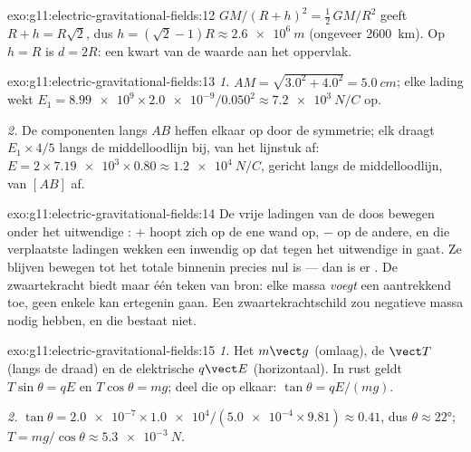 \begin{solution}{exo:g11:electric-gravitational-fields:12}
$GM/(R+h)^2 = \tfrac12\,GM/R^2$ geeft $R + h = R\sqrt{2}$, dus
$h = (\sqrt{2} - 1)R \approx \qty{2.6e6}{m}$ (ongeveer \qty{2600}{km}).
Op $h = R$ is $d = 2R$: een kwart van de waarde aan het oppervlak.
\end{solution}

\begin{solution}{exo:g11:electric-gravitational-fields:13}
\emph{1.} $AM = \sqrt{3.0^2 + 4.0^2} = \qty{5.0}{cm}$; elke lading wekt
$E_1 = \num{8.99e9} \times \num{2.0e-9} / 0.050^2 \approx
\qty{7.2e3}{N/C}$ op.

\emph{2.} De componenten langs $AB$ heffen elkaar op door de symmetrie;
elk  draagt $E_1 \times 4/5$ langs de middelloodlijn bij, van het
lijnstuk af: $E = 2 \times \num{7.19e3} \times 0.80 \approx
\qty{1.2e4}{N/C}$, gericht langs de middelloodlijn, van $[AB]$ af.
\end{solution}

\begin{solution}{exo:g11:electric-gravitational-fields:14}
De vrije ladingen van de doos bewegen onder het uitwendige : $+$
hoopt zich op de ene wand op, $-$ op de andere, en die verplaatste
ladingen wekken een inwendig  op dat tegen het uitwendige in gaat. Ze
blijven bewegen tot het totale  binnenin precies nul is --- dan is er
. De zwaartekracht biedt maar één teken van bron: elke massa
\emph{voegt} een aantrekkend  toe, geen enkele kan ertegenin gaan.
Een zwaartekrachtschild zou negatieve massa nodig hebben, en die bestaat
niet.
\end{solution}

\begin{solution}{exo:g11:electric-gravitational-fields:15}
\emph{1.} Het  $m\vect g$ (omlaag), de  $\vect T$ (langs
de draad) en de elektrische  $q\vect E$ (horizontaal). In rust
geldt $T\sin\theta = qE$ en $T\cos\theta = mg$; deel die op elkaar:
$\tan\theta = qE/(mg)$.

\emph{2.} $\tan\theta = \num{2.0e-7} \times \num{1.0e4} /
(\num{5.0e-4} \times 9.81) \approx 0.41$, dus
$\theta \approx \ang{22}$; $T = mg/\cos\theta \approx \qty{5.3e-3}{N}$.
\end{solution}

